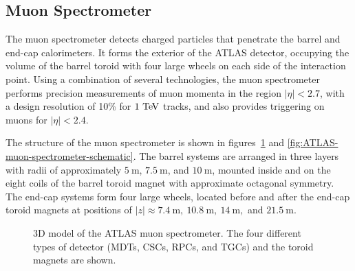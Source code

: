 \subsection{Muon Spectrometer}\label{sec:ATLAS-muon-spectrometer}
The muon spectrometer detects charged particles that penetrate the barrel and end-cap calorimeters. It forms the exterior of the ATLAS detector, occupying the volume of the barrel toroid with four large wheels on each side of the interaction point. Using a combination of several technologies, the muon spectrometer performs precision measurements of muon momenta in the region $|\eta|<2.7$, with a design resolution of 10\% for $1 \TeV$ tracks, and also provides triggering on muons for $|\eta|<2.4$. 

The structure of the muon spectrometer is shown in figures~\ref{fig:ATLAS-muon-spectrometer-layout} and \ref{fig:ATLAS-muon-spectrometer-schematic}. The barrel systems are arranged in three layers with radii of approximately $5~\mbox{m}$, $7.5~\mbox{m}$, and $10~\mbox{m}$, mounted inside and on the eight coils of the barrel toroid magnet with approximate octagonal symmetry. The end-cap systems form four large wheels, located before and after the end-cap toroid magnets at positions of $|z|\approx 7.4~\mbox{m},\ 10.8~\mbox{m},\ 14~\mbox{m},$ and $21.5~\mbox{m}$. 

\begin{figure}[htbp]
	\centering
	\caption{3D model of the ATLAS muon spectrometer. The four different types of detector (MDTs, CSCs, RPCs, and TGCs) and the toroid magnets are shown.}
	\label{fig:ATLAS-muon-spectrometer-layout}
\end{figure}

